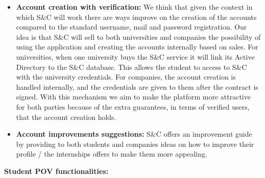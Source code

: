 \begin{itemize}
    \item \textbf{Account creation with verification:}
    We think that given the context in which S\&C will work there are ways improve on the creation of the accounts compared to the standard username, mail and password registration.
    Our idea is that S\&C will sell to both universities and companies the possibility of using the application and creating the accounts internally based on sales.
    For universities, when one university buys the S\&C service it will link its Active Directory to the S\&C database. This allows the student to access to S\&C with the university credentials.
    For companies, the account creation is handled internally, and the credentials are given to them after the contract is signed.
    With this mechanism we aim to make the platform more attractive for both parties because of the extra guarantees, in terms of verified users, that the account creation holds.
     
    \item \textbf{Account improvements suggestions:}
    S\&C offers an improvement guide by providing to both students and companies ideas on how to improve their profile / the internships offers to make them more appealing.
\end{itemize}

\par\textbf{Student POV functionalities:}

